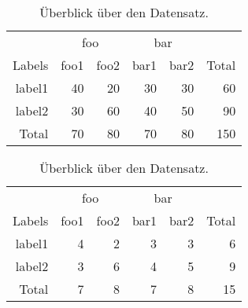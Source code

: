 \begin{table}[ht]
  \caption{Überblick über den Datensatz.}
  \begin{subtable}{\linewidth}
    \centering
    \begin{tabular}{rrrrrr}
      \toprule
      &\multicolumn{ 2 }{c}{ foo }&\multicolumn{ 2 }{c}{ bar }&\\
      \cmidrule(lr){ 2-3 }\cmidrule(lr){ 4-5 }
      Labels
        & foo1& foo2& bar1& bar2
        & Total\\
      \midrule
      label1
        & 40& 20& 30& 30
        & 60\\
      label2
        & 30& 60& 40& 50
        & 90\\
      \addlinespace
      Total
        & 70& 80& 70& 80
        & 150\\
      \bottomrule
    \end{tabular}
  \end{subtable}
  \par\bigskip
  \begin{subtable}{\linewidth}
    \centering
    \begin{tabular}{rrrrrr}
      \toprule
      &\multicolumn{ 2 }{c}{ foo }&\multicolumn{ 2 }{c}{ bar }&\\
      \cmidrule(lr){ 2-3 }\cmidrule(lr){ 4-5 }
      Labels
        & foo1& foo2& bar1& bar2
        & Total\\
      \midrule
      label1
        & 4& 2& 3& 3
        & 6\\
      label2
        & 3& 6& 4& 5
        & 9\\
      \addlinespace
      Total
        & 7& 8& 7& 8
        & 15\\
      \bottomrule
    \end{tabular}
  \end{subtable}
  \par\bigskip
\end{table}
